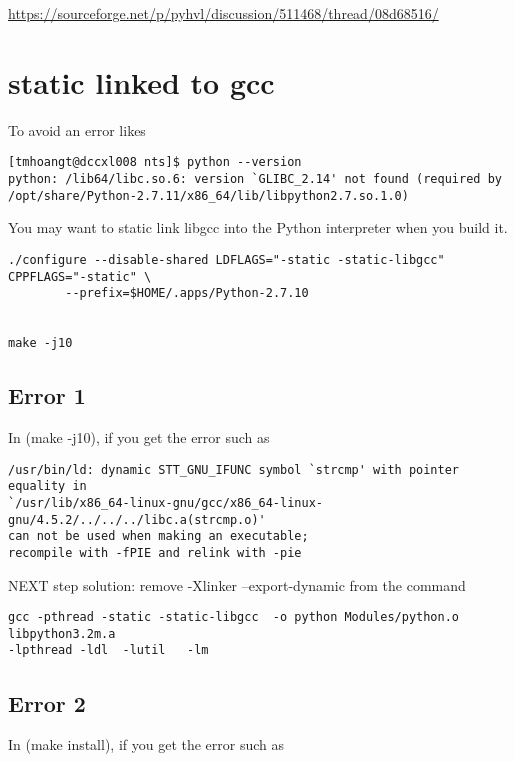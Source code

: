 \url{https://sourceforge.net/p/pyhvl/discussion/511468/thread/08d68516/}

\section{static linked to gcc}




To avoid an error likes
\begin{verbatim}
[tmhoangt@dccxl008 nts]$ python --version
python: /lib64/libc.so.6: version `GLIBC_2.14' not found (required by /opt/share/Python-2.7.11/x86_64/lib/libpython2.7.so.1.0)
\end{verbatim}
You may want to static link libgcc into the Python interpreter when you build
it.


\begin{verbatim}
./configure --disable-shared LDFLAGS="-static -static-libgcc" CPPFLAGS="-static" \ 
        --prefix=$HOME/.apps/Python-2.7.10


make -j10
\end{verbatim}
\subsection{Error 1}

In (make -j10), if you get the error such as
\begin{verbatim}
/usr/bin/ld: dynamic STT_GNU_IFUNC symbol `strcmp' with pointer equality in
`/usr/lib/x86_64-linux-gnu/gcc/x86_64-linux-gnu/4.5.2/../../../libc.a(strcmp.o)'
can not be used when making an executable;
recompile with -fPIE and relink with -pie
\end{verbatim}


NEXT step solution: remove -Xlinker --export-dynamic from the command
\begin{verbatim}
gcc -pthread -static -static-libgcc  -o python Modules/python.o libpython3.2m.a
-lpthread -ldl  -lutil   -lm

\end{verbatim}

\subsection{Error 2}

In (make install), if you get the error such as
\begin{verbatim}

\end{verbatim}

